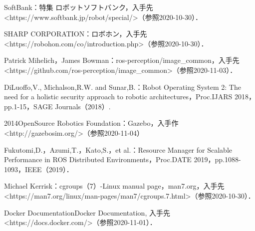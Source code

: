 \documentclass[11pt]{ujarticle} %
\begin{document}
\begin{thebibliography}{99}
  \begin{flushleft}
  SoftBank：特集 \textbar ロボット\textbar ソフトバンク，入手先\textless https://www.softbank.jp/robot/special/\textgreater（参照2020-10-30）．
  \end{flushleft}
  \begin{flushleft}
    SHARP CORPORATION：ロボホン，入手先\textless https://robohon.com/co/introduction.php\textgreater（参照2020-10-30）．
    \end{flushleft}
  \begin{flushleft}
  Patrick Mihelich，James Bowman：ros-perception/image\_common，入手先\textless https://github.com/ros-perception/image_common\textgreater（参照2020-11-03）．
  \end{flushleft}
  \begin{flushleft}
  DiLuoffo,V., Michalson,R.W. and Sunar,B.：Robot Operating System 2: The need for a holistic security approach to robotic architectures，Proc.IJARS 2018，pp.1-15，SAGE Journals（2018）.
  \end{flushleft}
  \begin{flushleft}
  2014OpenSource Robotics Foundation：Gazebo，入手作\textless http://gazebosim.org/\textgreater（参照2020-11-04）
  \end{flushleft}
  \begin{flushleft}
  Fukutomi,D.，Azumi,T.，Kato,S.，et al.：Resource Manager for Scalable Performance in ROS Distributed Environments，Proc.DATE 2019，pp.1088-1093，IEEE（2019）．
  \end{flushleft}
  \begin{flushleft}
  Michael Kerrisk：cgroups（7）-Linux manual page，man7.org，入手先\textless https://man7.org/linux/man-pages/man7/cgroups.7.html\textgreater（参照2020-10-30）．
  \end{flushleft}
  \begin{flushleft}
  Docker Documentation\textbar Docker Documentation, 入手先\textless https://docs.docker.com/\textgreater（参照2020-11-01）．\end{flushleft}

\end{thebibliography}
\end{document}
